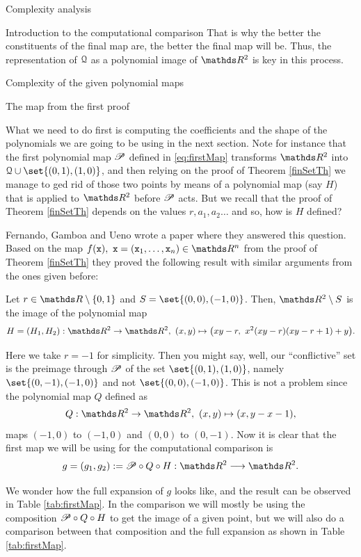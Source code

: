 \documentclass[11pt, a4paper, english, twoside, notitlepage, openright]{report}
\begin{document}
\begin{chapter}{Complexity analysis}
\begin{section}{Introduction to the computational comparison}
That is why the better the constituents of the final map are, the better the final map will be.  Thus, the representation of $\Qu$ as a polynomial image of $\R^2$ is key in this process.	
\end{section}

\begin{section}{Complexity of the given polynomial maps}\label{5sect2}

\begin{subsection}{The map from the first proof}

What we need to do first is computing the coefficients and the shape of the polynomials we are going to be using in the next section. Note for instance that the first polynomial map $\P$ defined in \ref{eq:firstMap} transforms $\R^2$ into $\Qu \cup \set{(0,1), (1,0)}$, and then relying on the proof of Theorem \ref{finSetTh} we manage to ged rid of those two points by means of a polynomial map (say $H$) that is applied to $\R^2$ before $\P$ acts. But we recall that the proof of Theorem \ref{finSetTh} depends on the values $r, a_1, a_2\dots$ and so, how is $H$ defined?

Fernando, Gamboa and Ueno wrote a paper \cite{fgu1} where they answered this question. Based on the map $f(\x), \ \x=(\x_1,\dots,\x_n)\in \R^n$ from the proof of Theorem \ref{finSetTh} they proved the following result with similar arguments from the ones given before:

\begin{lemma}
Let $r\in\R\setminus\{0,1\}$ and $S=\set{(0,0),(-1,0)}$. Then, $\R^2\setminus S$ is the image of the polynomial map 
$$
H=(H_1,H_2):\R^2\to\R^2,\ (x,y)\mapsto\big(xy-r,\ x^2(xy-r)(xy-r+1)+y\big).
$$	
\end{lemma}

Here we take $r=-1$ for simplicity. Then you might say, well, our ``conflictive'' set is the preimage through $\P$ of the set $\set{(0,1),(1,0)}$, namely $\set{(0,-1),(-1,0)}$ and not $\set{(0,0),(-1,0)}$. This is not a problem since the polynomial map $Q$ defined as
$$
Q:\R^2\to\R^2,\ (x,y)\mapsto(x,y-x-1),
$$
maps $(-1,0)$ to $(-1,0)$ and $(0,0)$ to $(0,-1)$. Now it is clear that the first map we will be using for the computational comparison is
$$
g=(g_1, g_2):=\P\circ Q\circ H:\R^2\longrightarrow\R^2.
$$

We wonder how the full expansion of $g$ looks like, and the result can be observed in Table \ref{tab:firstMap}. In the comparison we will mostly be using the composition $\P\circ Q\circ H$ to get the image of a given point, but we will also do a comparison between that composition and the full expansion as shown in Table \ref{tab:firstMap}.


\end{subsection}
\end{section}
\end{chapter}
\end{document}
